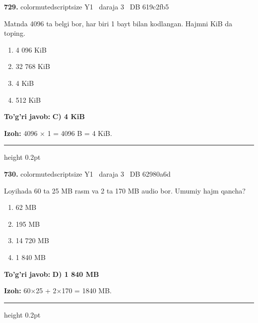 \documentclass[10pt,a4paper,oneside]{article}
\begin{document}
\noindent\textbf{\color{ink}729.}  {color{muted}scriptsize Y1 \textbullet\ daraja 3 \textbullet\ DB 619c2fb5}
\par
Matnda 4096 ta belgi bor, har biri 1 bayt bilan kodlangan. Hajmni KiB da toping.
\begin{enumerate}[label=\Alph*),leftmargin=9mm]
\item 4 096 KiB
\item 32 768 KiB
\item 4 KiB
\item 512 KiB
\end{enumerate}
\begin{tcolorbox}[enhanced,breakable,colback=teal!4,colframe=teal!50!black,boxrule=0.5pt,arc=1.1mm,left=3mm,right=3mm,top=1.7mm,bottom=1.7mm,before skip=2mm,after skip=2mm]
\textbf{\color{teal}To'g'ri javob:} \textbf{C) 4 KiB}
\par\smallskip
\textbf{Izoh:} 4096 \ensuremath{\times} 1 = 4096 B = 4 KiB.
\end{tcolorbox}
\vspace{2mm}\hrule height 0.2pt \vspace{3mm}

\noindent\textbf{\color{ink}730.}  {color{muted}scriptsize Y1 \textbullet\ daraja 3 \textbullet\ DB 62980a6d}
\par
Loyihada 60 ta 25 MB rasm va 2 ta 170 MB audio bor. Umumiy hajm qancha?
\begin{enumerate}[label=\Alph*),leftmargin=9mm]
\item 62 MB
\item 195 MB
\item 14 720 MB
\item 1 840 MB
\end{enumerate}
\begin{tcolorbox}[enhanced,breakable,colback=teal!4,colframe=teal!50!black,boxrule=0.5pt,arc=1.1mm,left=3mm,right=3mm,top=1.7mm,bottom=1.7mm,before skip=2mm,after skip=2mm]
\textbf{\color{teal}To'g'ri javob:} \textbf{D) 1 840 MB}
\par\smallskip
\textbf{Izoh:} 60\ensuremath{\times}25 + 2\ensuremath{\times}170 = 1840 MB.
\end{tcolorbox}
\vspace{2mm}\hrule height 0.2pt \vspace{3mm}
\end{document}
